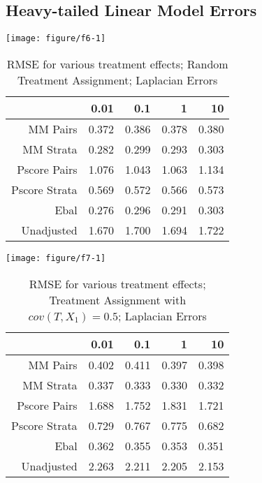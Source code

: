 \documentclass[11pt]{article}\usepackage[]{graphicx}\usepackage[]{color}
\makeatletter
\def\maxwidth{ %
  \ifdim\Gin@nat@width>\linewidth
    \linewidth
  \else
    \Gin@nat@width
  \fi
}
\newenvironment{knitrout}{}{} %
\makeatother
\begin{document}
\subsection{Heavy-tailed Linear Model Errors}
\begin{knitrout}
\color{fgcolor}

{\centering \texttt{[image: figure/f6-1]} 

}



\end{knitrout}
\begin{table}[ht]
\centering
\begin{tabular}{rrrrr}
  \hline
 & 0.01 & 0.1 & 1 & 10 \\ 
  \hline
MM Pairs & 0.372 & 0.386 & 0.378 & 0.380 \\ 
  MM Strata & 0.282 & 0.299 & 0.293 & 0.303 \\ 
  Pscore Pairs & 1.076 & 1.043 & 1.063 & 1.134 \\ 
  Pscore Strata & 0.569 & 0.572 & 0.566 & 0.573 \\ 
  Ebal & 0.276 & 0.296 & 0.291 & 0.303 \\ 
  Unadjusted & 1.670 & 1.700 & 1.694 & 1.722 \\ 
   \hline
\end{tabular}
\caption{RMSE for various treatment effects; Random Treatment Assignment; Laplacian Errors} 
\label{tab:f6}
\end{table}


\begin{knitrout}
\color{fgcolor}

{\centering \texttt{[image: figure/f7-1]} 

}



\end{knitrout}
\begin{table}[ht]
\centering
\begin{tabular}{rrrrr}
  \hline
 & 0.01 & 0.1 & 1 & 10 \\ 
  \hline
MM Pairs & 0.402 & 0.411 & 0.397 & 0.398 \\ 
  MM Strata & 0.337 & 0.333 & 0.330 & 0.332 \\ 
  Pscore Pairs & 1.688 & 1.752 & 1.831 & 1.721 \\ 
  Pscore Strata & 0.729 & 0.767 & 0.775 & 0.682 \\ 
  Ebal & 0.362 & 0.355 & 0.353 & 0.351 \\ 
  Unadjusted & 2.263 & 2.211 & 2.205 & 2.153 \\ 
   \hline
\end{tabular}
\caption{RMSE for various treatment effects; Treatment Assignment with $cov(T, X_1) = 0.5$; Laplacian Errors} 
\label{tab:f7}
\end{table}
\end{document}
